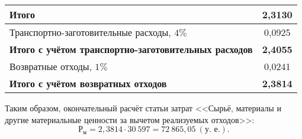 \begin{table} [h!]
{\begin{tabular}{| m{2.8cm} | c | c | c | c | c |}
      \multicolumn{5}{|l|}{\textbf{Итого}} & \textbf{2,3130} \\ \hline
      \multicolumn{5}{|l|}{Транспортно-заготовительные расходы, $4\%$} & 0,0925 \\ \hline
      \multicolumn{5}{|l|}{\textbf{Итого с учётом транспортно-заготовительных расходов}} & \textbf{2,4055}  \\ \hline
      \multicolumn{5}{|l|}{Возвратные отходы, $1\%$} & 0,0241  \\ \hline
      \multicolumn{5}{|l|}{\textbf{Итого с учётом возвратных отходов}} & \textbf{2,3814}  \\ \hline

    \end{tabular}
  }
\end{table}

Таким образом, окончательный расчёт статьи затрат <<Сырьё, материалы и другие
материальные ценности за вычетом реализуемых отходов>>:
\begin{equation*}
  \text{Р}_\text{м} = 2{,}3814 \cdot 30~597 = 72~865{,}05~(\text{у.~е.}).
\end{equation*}

\newpage

